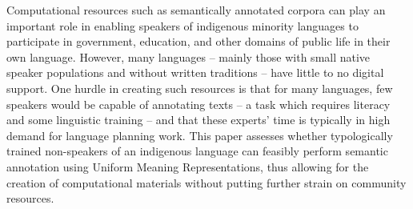 Computational resources such as semantically annotated corpora can play an important role in enabling speakers of indigenous minority languages to participate in government, education, and other domains of public life in their own language. However, many languages -- mainly those with small native speaker populations and without written traditions -- have little to no digital support. One hurdle in creating such resources is that for many languages, few speakers would be capable of annotating texts -- a task which requires literacy and some linguistic training -- and that these experts' time is typically in high demand for language planning work. This paper assesses whether typologically trained non-speakers of an indigenous language can feasibly perform semantic annotation using Uniform Meaning Representations, thus allowing for the creation of computational materials without putting further strain on community resources.
